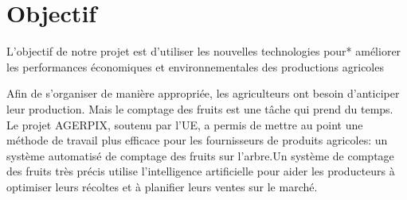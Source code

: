\section{Objectif }
L'objectif de notre projet est d’utiliser les nouvelles technologies pour*
améliorer les performances économiques et environnementales des productions agricoles



Afin de s’organiser de manière appropriée, les agriculteurs ont besoin d’anticiper leur production. Mais le comptage des fruits est une tâche qui prend du temps. Le projet AGERPIX, soutenu par l’UE, a permis de mettre au point une méthode de travail plus efficace pour les fournisseurs de produits agricoles: un système automatisé de comptage des fruits sur l’arbre.Un système de comptage des fruits très précis utilise l’intelligence artificielle pour aider les producteurs à optimiser leurs récoltes et à planifier leurs ventes sur le marché.